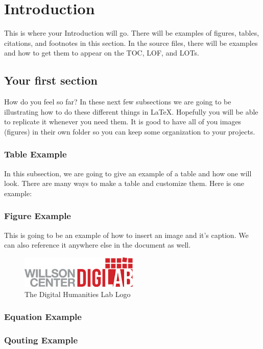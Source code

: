\documentclass[./dissertation.tex]{subfiles}
\begin{document}
    \chapter{Introduction}
    This is where your Introduction will go. There will be examples of figures, tables, citations, and footnotes in this section. In the source files, there will be examples and how to get them to appear on the TOC, LOF, and LOTs.
    \section{Your first section}
      How do you feel so far? In these next few subsections we are going to be illustrating how to do these different things in LaTeX. Hopefully you will be able to replicate it whenever you need them.
      It is good to have all of you images (figures) in their own folder so you can keep some organization to your projects.

      \subsection{Table Example}
      In this subsection, we are going to give an example of a table and how one will look. There are many ways to make a table and customize them. Here is one example:



      \subsection{Figure Example}
      This is going to be an example of how to insert an image and it's caption. We can also reference it anywhere else in the document as well.
      \begin{figure}[h]
        \centering\includegraphics[width=0.5\textwidth]{figures/digilab_logo}
        \caption{The Digital Humanities Lab Logo}
      \end{figure}



      \subsection{Equation Example}

      \subsection{Qouting Example}
\end{document}
